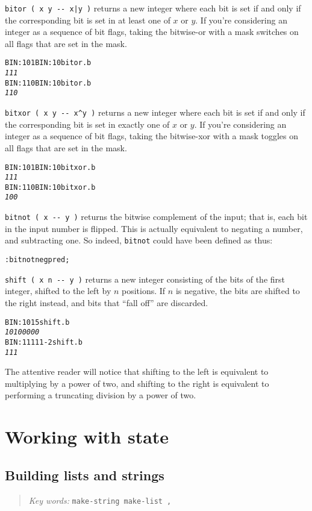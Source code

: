 \documentclass[english]{book}
\newcommand{\chapkeywords}[1]{%
\begin{quote}
\emph{Key words:} \texttt{#1}
\end{quote}
}
\begin{document}
\texttt{bitor ( x y -{}- x|y )} returns a new integer where each bit is set if and only if the corresponding bit is set in at least one of $x$ or $y$. If you're considering an integer as a sequence of bit flags, taking the bitwise-or with a mask switches on all flags that are set in the mask.

\begin{alltt}
BIN: 101 BIN: 10 bitor .b
\emph{111}
BIN: 110 BIN: 10 bitor .b
\emph{110}
\end{alltt}

\texttt{bitxor ( x y -{}- x\^{}y )} returns a new integer where each bit is set if and only if the corresponding bit is set in exactly one of $x$ or $y$. If you're considering an integer as a sequence of bit flags, taking the bitwise-xor with a mask toggles on all flags that are set in the mask.

\begin{alltt}
BIN: 101 BIN: 10 bitxor .b
\emph{111}
BIN: 110 BIN: 10 bitxor .b
\emph{100}
\end{alltt}

\texttt{bitnot ( x -{}- y )} returns the bitwise complement of the input; that is, each bit in the input number is flipped. This is actually equivalent to negating a number, and subtracting one. So indeed, \texttt{bitnot} could have been defined as thus:

\begin{alltt}
: bitnot neg pred ;
\end{alltt}

\texttt{shift ( x n -{}- y )} returns a new integer consisting of the bits of the first integer, shifted to the left by $n$ positions. If $n$ is negative, the bits are shifted to the right instead, and bits that ``fall off'' are discarded.

\begin{alltt}
BIN: 101 5 shift .b
\emph{10100000}
BIN: 11111 -2 shift .b
\emph{111}
\end{alltt}

The attentive reader will notice that shifting to the left is equivalent to multiplying by a power of two, and shifting to the right is equivalent to performing a truncating division by a power of two.

\chapter{Working with state}

\section{Building lists and strings}

\chapkeywords{make-string make-list ,}



\end{document}
